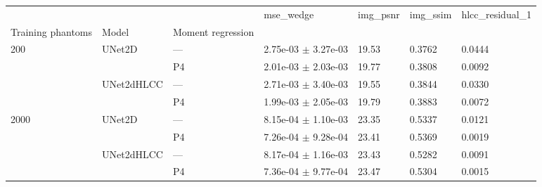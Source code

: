 \begin{tabular}{lllllll}
\toprule
 &  &  & mse\_wedge & img\_psnr & img\_ssim & hlcc\_residual\_1 \\
Training phantoms & Model & Moment regression &  &  &  &  \\
\midrule
\multirow[t]{4}{*}{200} & \multirow[t]{2}{*}{UNet2D} & — & 2.75e-03 $\pm$ 3.27e-03 & 19.53 & 0.3762 & 0.0444 \\
 &  & P4 & 2.01e-03 $\pm$ 2.03e-03 & 19.77 & 0.3808 & 0.0092 \\
\cline{2-7}
 & \multirow[t]{2}{*}{UNet2dHLCC} & — & 2.71e-03 $\pm$ 3.40e-03 & 19.55 & 0.3844 & 0.0330 \\
 &  & P4 & 1.99e-03 $\pm$ 2.05e-03 & 19.79 & 0.3883 & 0.0072 \\
\cline{1-7} \cline{2-7}
\multirow[t]{4}{*}{2000} & \multirow[t]{2}{*}{UNet2D} & — & 8.15e-04 $\pm$ 1.10e-03 & 23.35 & 0.5337 & 0.0121 \\
 &  & P4 & 7.26e-04 $\pm$ 9.28e-04 & 23.41 & 0.5369 & 0.0019 \\
\cline{2-7}
 & \multirow[t]{2}{*}{UNet2dHLCC} & — & 8.17e-04 $\pm$ 1.16e-03 & 23.43 & 0.5282 & 0.0091 \\
 &  & P4 & 7.36e-04 $\pm$ 9.77e-04 & 23.47 & 0.5304 & 0.0015 \\
\cline{1-7} \cline{2-7}
\bottomrule
\end{tabular}
